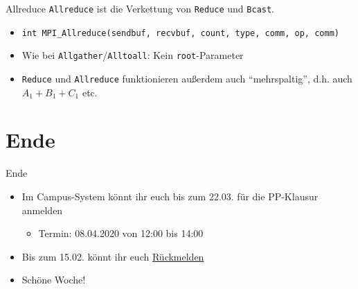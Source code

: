 \documentclass{beamer}
\begin{document}
\begin{frame}{Allreduce}
	\texttt{Allreduce} ist die Verkettung von \texttt{Reduce} und \texttt{Bcast}.

	\begin{figure}
	\end{figure}

	\begin{itemize}
		\item {\footnotesize \texttt{int MPI\_Allreduce(sendbuf, recvbuf, count, type, comm, op, comm)}}
                \item Wie bei \texttt{Allgather}/\texttt{Alltoall}: Kein \texttt{root}-Parameter
                \item \texttt{Reduce} und \texttt{Allreduce} funktionieren außerdem auch \enquote{mehrspaltig}, d.h. auch $A_1 + B_1 + C_1$ etc.
	\end{itemize}
\end{frame}

\section{Ende}

\begin{frame}{Ende}
	\begin{itemize}
		\item Im Campus-System könnt ihr euch bis zum 22.03. für die PP-Klausur anmelden
                \begin{itemize}
                  \item Termin: 08.04.2020 von 12:00 bis 14:00
                \end{itemize}
		\item Bis zum 15.02. könnt ihr euch \href{https://campus.studium.kit.edu/renewal/payment.php}{Rückmelden}
		\item Schöne Woche!
	\end{itemize}
\end{frame}
\end{document}
